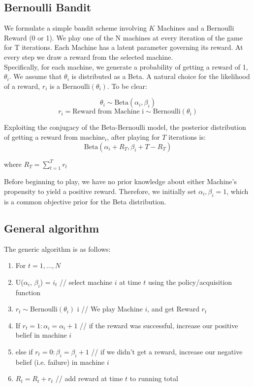 \documentclass{article}
\begin{document}
\subsection{Bernoulli Bandit}

We formulate a simple bandit scheme involving $K$ Machines and a Bernoulli Reward (0 or 1). We play one of the N machines at every iteration of the game for T iterations. Each Machine has a latent parameter governing its reward. At every step we draw a reward from the selected machine.\\

Specifically, for each machine, we generate a probability of getting a reward of 1, $\theta_i$. We assume that $\theta_i$ is distributed as a Beta. A natural choice for the likelihood of a reward, $r_i$ is a $\text{Bernoulli}(\theta_i)$. To be clear:

$$\theta_i \sim \text{Beta}(\alpha_i, \beta_i)$$
$$r_i = \text{Reward from Machine i} \sim \text{Bernoulli}(\theta_i)$$

Exploiting the conjugacy of the Beta-Bernoulli model, the posterior distribution of getting a reward from $\text{machine}_i$, after playing for $T$ iterations is:
$$\text{Beta}(\alpha_i + R_{T}, \beta_i + T - R_{T})$$

where $R_{T} = \sum_{t=1}^{T}r_{t}$

Before beginning to play, we have no prior knowledge about either Machine's propensity to yield a positive reward. Therefore, we initially set $\alpha_i, \beta_i = 1$, which is a common objective prior for the Beta distribution.\\

\subsection{General algorithm}

The generic algorithm is as follows:

\begin{enumerate}
\item For $t = 1, ..., N$
\item U($\alpha_i$, $\beta_i$) = $i_t$  // select machine $i$ at time $t$ using the policy/acquisition function
\item $r_t \sim \text{Bernoulli}(\theta_{i})$  i  // We play Machine $i$, and get Reward $r_t$
\item If $r_t = 1: \alpha_i = \alpha_i + 1$   // if the reward was successful, increase our positive belief in machine $i$
\item else if $r_t = 0: \beta_i = \beta_i + 1$  // if we didn't get a reward, increase our negative belief (i.e. failure) in machine $i$
\item $R_t = R_t + r_t$		// add reward at time $t$ to running total
\end{enumerate}
\end{document}
